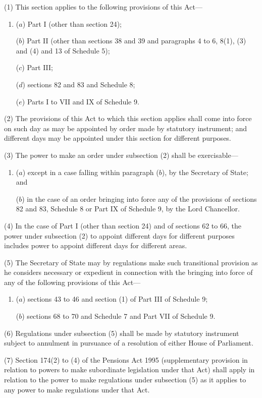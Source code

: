 \documentclass[12pt,a4paper]{article}
\begin{document}
(1) This section applies to the following provisions of this Act—
\begin{enumerate}\item[]
($a$) Part I (other than section 24);

($b$) Part II (other than sections 38 and 39 and paragraphs 4 to 6, 8(1), (3)  and (4)  and 13 of Schedule 5);

($c$) Part III;

($d$) sections 82 and 83 and Schedule 8;

($e$) Parts I to VII and IX of Schedule 9. 
\end{enumerate}

(2) The provisions of this Act to which this section applies shall come into force on such day as may be appointed by order made by statutory instrument; and different days may be appointed under this section for different purposes.

(3) The power to make an order under subsection (2)  shall be exercisable—
\begin{enumerate}\item[]
($a$) except in a case falling within paragraph ($b$), by the Secretary of State; and

($b$) in the case of an order bringing into force any of the provisions of sections 82 and 83, Schedule 8 or Part IX of Schedule 9, by the Lord Chancellor.
\end{enumerate}

(4) In the case of Part I (other than section 24) and of sections 62 to 66, the power under subsection (2)  to appoint different days for different purposes includes power to appoint different days for different areas.

(5) The Secretary of State may by regulations make such transitional provision as he considers necessary or expedient in connection with the bringing into force of any of the following provisions of this Act—
\begin{enumerate}\item[]
($a$) sections 43 to 46 and section (1)  of Part III of Schedule 9;

($b$) sections 68 to 70 and Schedule 7 and Part VII of Schedule 9. 
\end{enumerate}

(6) Regulations under subsection (5)  shall be made by statutory instrument subject to annulment in pursuance of a resolution of either House of Parliament.

(7) Section 174(2)  to (4)  of the Pensions Act 1995 (supplementary provision in relation to powers to make subordinate legislation under that Act) shall apply in relation to the power to make regulations under subsection (5)  as it applies to any power to make regulations under that Act.
\end{document}
